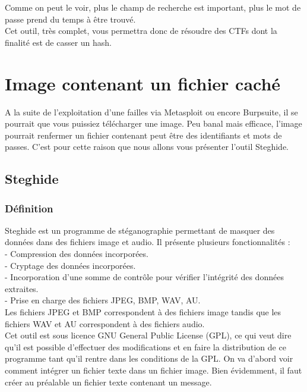 Comme on peut le voir, plus le champ de recherche est important, plus le mot de passe prend du temps à être trouvé.\\

Cet outil, très complet, vous permettra donc de résoudre des CTFs dont la finalité est de casser un hash.


\section{Image contenant un fichier caché}

A la suite de l'exploitation d'une failles via Metasploit ou encore Burpsuite, il se pourrait que vous puissiez télécharger une image. Peu banal mais efficace, l'image pourrait renfermer un fichier contenant peut être des identifiants et mots de passes. C'est pour cette raison que nous allons vous présenter l'outil Steghide.

\subsection{Steghide}

\subsubsection{Définition}

Steghide est un programme de stéganographie permettant de masquer des données dans des fichiers image et audio. Il présente plusieurs fonctionnalités :\\
-        Compression des données incorporées.\\
-        Cryptage des données incorporées.\\
-        Incorporation d’une somme de contrôle pour vérifier l’intégrité des données extraites.\\
-        Prise en charge des fichiers JPEG, BMP, WAV, AU.\\
Les fichiers JPEG et BMP correspondent à des fichiers image tandis que les fichiers WAV et AU correspondent à des fichiers audio. \\
Cet outil est sous licence GNU General Public License (GPL), ce qui veut dire qu’il est possible d’effectuer des modifications et en faire la distribution de ce programme tant qu’il rentre dans les conditions de la GPL.
On va d’abord voir comment intégrer un fichier texte dans un fichier image. Bien évidemment, il faut créer au préalable un fichier texte contenant un message.

